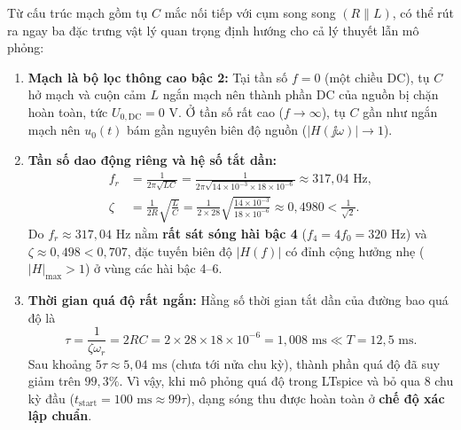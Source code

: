 Từ cấu trúc mạch gồm tụ $C$ mắc nối tiếp với cụm song song $(R \parallel L)$, có thể rút ra ngay ba đặc trưng vật lý quan trọng định hướng cho cả lý thuyết lẫn mô phỏng:
\begin{enumerate}
    \item \textbf{Mạch là bộ lọc thông cao bậc 2:} Tại tần số $f = 0$ (một chiều DC), tụ $C$ hở mạch và cuộn cảm $L$ ngắn mạch nên thành phần DC của nguồn bị chặn hoàn toàn, tức $U_{0,\text{DC}} = 0\text{ V}$. Ở tần số rất cao ($f \to \infty$), tụ $C$ gần như ngắn mạch nên $u_0(t)$ bám gần nguyên biên độ nguồn ($|H(\jj\omega)| \to 1$).
    \item \textbf{Tần số dao động riêng và hệ số tắt dần:}
    \begin{align}
        f_r &= \frac{1}{2\pi\sqrt{LC}} = \frac{1}{2\pi\sqrt{14 \times 10^{-3} \times 18 \times 10^{-6}}} \approx 317{,}04\text{ Hz}, \\
        \zeta &= \frac{1}{2R}\sqrt{\frac{L}{C}} = \frac{1}{2 \times 28}\sqrt{\frac{14 \times 10^{-3}}{18 \times 10^{-6}}} \approx 0{,}4980 < \frac{1}{\sqrt{2}}.
    \end{align}
    Do $f_r \approx 317{,}04\text{ Hz}$ nằm \textbf{rất sát sóng hài bậc 4} ($f_4 = 4f_0 = 320\text{ Hz}$) và $\zeta \approx 0{,}498 < 0{,}707$, đặc tuyến biên độ $|H(f)|$ có đỉnh cộng hưởng nhẹ ($|H|_{\max} > 1$) ở vùng các hài bậc 4--6.
    \item \textbf{Thời gian quá độ rất ngắn:} Hằng số thời gian tắt dần của đường bao quá độ là
    \begin{equation}
        \tau = \frac{1}{\zeta\omega_r} = 2RC = 2 \times 28 \times 18 \times 10^{-6} = 1{,}008\text{ ms} \ll T = 12{,}5\text{ ms}.
    \end{equation}
    Sau khoảng $5\tau \approx 5{,}04\text{ ms}$ (chưa tới nửa chu kỳ), thành phần quá độ đã suy giảm trên $99{,}3\%$. Vì vậy, khi mô phỏng quá độ trong LTspice và bỏ qua $8$ chu kỳ đầu ($t_{\text{start}} = 100\text{ ms} \approx 99\tau$), dạng sóng thu được hoàn toàn ở \textbf{chế độ xác lập chuẩn}.
\end{enumerate}
